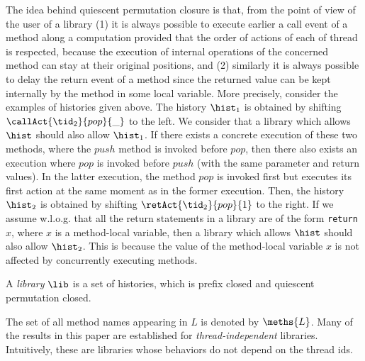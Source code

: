 The idea behind quiescent permutation closure is that, from the point of view of the user of a library (1) it is always possible to execute earlier a call  event of a method along a computation provided that the order of actions of each of thread is respected, because the execution of internal operations of the concerned method can stay at their original positions, and (2) similarly  it is always possible to delay the return event of a method since the returned value can be kept internally by the method in some local variable. More precisely, consider the examples of histories given above.
%
The history $\hist_1$ is obtained by shifting $\callAct{\tid_2}{pop}{\_}$ to the left. We consider that a library %
which allows $\hist$ should also allow $\hist_1$. If there exists a concrete execution of these two methods, where the $push$ method is invoked before $pop$, then there also exists an execution where $pop$ is invoked before $push$ (with the same parameter and return values). In the latter execution, the method $pop$ is invoked first but executes its first action at the same moment as in the former execution.
Then, the history $\hist_2$ is obtained by shifting $\retAct{\tid_2}{pop}{1}$ to the right. If we assume w.l.o.g. that all the return statements in a library are of the form {\tt return} $x$, where $x$ is a method-local variable, then a library which allows $\hist$ should also allow $\hist_2$. This is because the value of the method-local variable $x$ is not affected by concurrently executing methods.

\begin{definition}[Library]
A \emph{library} $\lib$ is a set of histories, which is prefix closed and quiescent permutation closed.
\end{definition}


The set of all method names appearing in $L$ is denoted by $\meths{L}$.
%
%
Many of the results in this paper are established for  \emph{thread-independent} libraries. Intuitively, these are libraries whose behaviors do not depend on the thread ids. 

